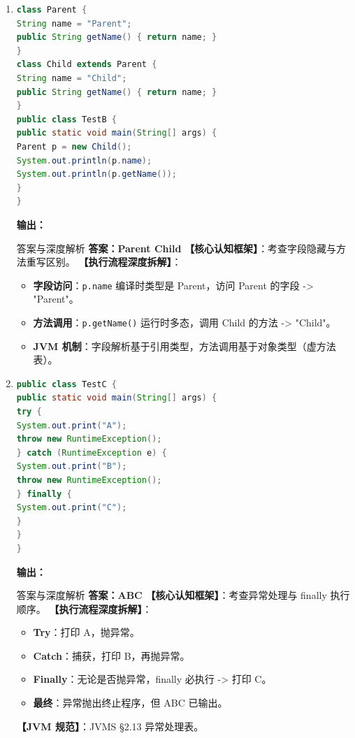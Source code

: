 ﻿\documentclass[12pt, a4paper]{ctexart}
\newcommand{\code}[1]{\texttt{#1}}
\begin{document}
\begin{enumerate}[label=\arabic*., itemsep=1.5em]
	\item
	      \begin{lstlisting}[language=Java]
class Parent {
String name = "Parent";
public String getName() { return name; }
}
class Child extends Parent {
String name = "Child";
public String getName() { return name; }
}
public class TestB {
public static void main(String[] args) {
Parent p = new Child();
System.out.println(p.name);
System.out.println(p.getName());
}
}
    \end{lstlisting}
	      \textbf{输出：}\underline{\hspace{5cm}}
	      \begin{bluebox}{答案与深度解析}
		      \textbf{答案：Parent \newline Child}
		      \textbf{【核心认知框架】}：考查字段隐藏与方法重写区别。
		      \textbf{【执行流程深度拆解】}：
		      \begin{itemize}[leftmargin=*, nosep]
			      \item \textbf{字段访问}：\code{p.name} 编译时类型是 Parent，访问 Parent 的字段 -> "Parent"。
			      \item \textbf{方法调用}：\code{p.getName()} 运行时多态，调用 Child 的方法 -> "Child"。
			      \item \textbf{JVM 机制}：字段解析基于引用类型，方法调用基于对象类型（虚方法表）。
		      \end{itemize}
	      \end{bluebox}

	\item
	      \begin{lstlisting}[language=Java]
public class TestC {
public static void main(String[] args) {
try {
System.out.print("A");
throw new RuntimeException();
} catch (RuntimeException e) {
System.out.print("B");
throw new RuntimeException();
} finally {
System.out.print("C");
}
}
}
    \end{lstlisting}
	      \textbf{输出：}\underline{\hspace{5cm}}
	      \begin{bluebox}{答案与深度解析}
		      \textbf{答案：ABC}
		      \textbf{【核心认知框架】}：考查异常处理与 finally 执行顺序。
		      \textbf{【执行流程深度拆解】}：
		      \begin{itemize}[leftmargin=*, nosep]
			      \item \textbf{Try}：打印 A，抛异常。
			      \item \textbf{Catch}：捕获，打印 B，再抛异常。
			      \item \textbf{Finally}：无论是否抛异常，finally 必执行 -> 打印 C。
			      \item \textbf{最终}：异常抛出终止程序，但 ABC 已输出。
		      \end{itemize}
		      \textbf{【JVM 规范】}：JVMS §2.13 异常处理表。
	      \end{bluebox}


\end{enumerate}
\end{document}
